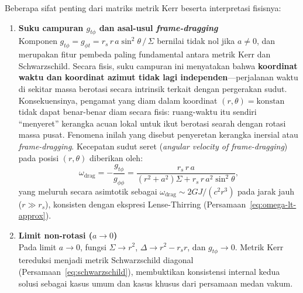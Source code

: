 Beberapa sifat penting dari matriks metrik Kerr beserta interpretasi fisisnya:

\begin{enumerate}[label=(\alph*), wide=0pt, leftmargin=*]
    \item \textbf{Suku campuran $g_{t\phi}$ dan asal-usul \textit{frame-dragging}}\\
    Komponen $g_{t\phi} = g_{\phi t} = r_s\, r\, a \sin^2\!\theta\,/\,\Sigma$ bernilai tidak nol jika $a \neq 0$, dan merupakan fitur pembeda paling fundamental antara metrik Kerr dan Schwarzschild. Secara fisis, suku campuran ini menyatakan bahwa \textbf{koordinat waktu dan koordinat azimut tidak lagi independen}---perjalanan waktu di sekitar massa berotasi secara intrinsik terkait dengan pergerakan sudut. Konsekuensinya, pengamat yang diam dalam koordinat $(r, \theta) = \text{konstan}$ tidak dapat benar-benar diam secara fisis: ruang-waktu itu sendiri ``menyeret'' kerangka acuan lokal untuk ikut berotasi searah dengan rotasi massa pusat. Fenomena inilah yang disebut penyeretan kerangka inersial atau \textit{frame-dragging}. Kecepatan sudut seret (\textit{angular velocity of frame-dragging}) pada posisi $(r, \theta)$ diberikan oleh:
    \begin{equation}
        \omega_{\text{drag}} = -\frac{g_{t\phi}}{g_{\phi\phi}} = \frac{r_s\, r\, a}{\left(r^2 + a^2\right)\Sigma + r_s\, r\, a^2 \sin^2\!\theta},
        \label{eq:omega-drag}
    \end{equation}
    yang meluruh secara asimtotik sebagai $\omega_{\text{drag}} \sim 2GJ/(c^2 r^3)$ pada jarak jauh ($r \gg r_s$), konsisten dengan ekspresi Lense-Thirring (Persamaan~\ref{eq:omega-lt-approx}).

    \item \textbf{Limit non-rotasi ($a \to 0$)}\\
    Pada limit $a \to 0$, fungsi $\Sigma \to r^2$, $\Delta \to r^2 - r_s r$, dan $g_{t\phi} \to 0$. Metrik Kerr tereduksi menjadi metrik Schwarzschild diagonal (Persamaan~\ref{eq:schwarzschild}), membuktikan konsistensi internal kedua solusi sebagai kasus umum dan kasus khusus dari persamaan medan vakum.


\end{enumerate}
